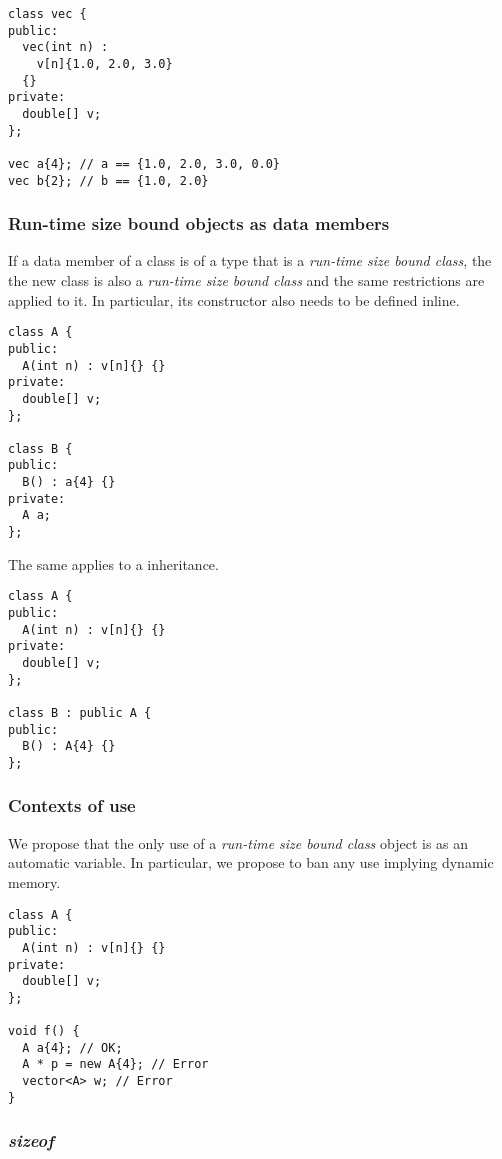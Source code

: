 \begin{lstlisting}
class vec {
public:
  vec(int n) :
    v[n]{1.0, 2.0, 3.0}
  {}
private:
  double[] v;
};

vec a{4}; // a == {1.0, 2.0, 3.0, 0.0}
vec b{2}; // b == {1.0, 2.0}
\end{lstlisting}

\subsubsection{Run-time size bound objects as data members}

If a data member of a class is of a type that is a \emph{run-time size bound class}, the the new 
class is also a \emph{run-time size bound class} and the same restrictions are
applied to it. In particular, its constructor also needs to be defined inline.

\begin{lstlisting}
class A {
public:
  A(int n) : v[n]{} {}
private:
  double[] v;
};

class B {
public:
  B() : a{4} {}
private:
  A a;
};
\end{lstlisting}

The same applies to a inheritance.

\begin{lstlisting}
class A {
public:
  A(int n) : v[n]{} {}
private:
  double[] v;
};

class B : public A {
public:
  B() : A{4} {}
};
\end{lstlisting}

\subsubsection{Contexts of use}

We propose that the only use of a \emph{run-time size bound class} object is as
an automatic variable. In particular, we propose to ban any use implying dynamic
memory.

\begin{lstlisting}
class A {
public:
  A(int n) : v[n]{} {}
private:
  double[] v;
};

void f() {
  A a{4}; // OK;
  A * p = new A{4}; // Error
  vector<A> w; // Error
}
\end{lstlisting}

\subsubsection{\emph{sizeof}}

